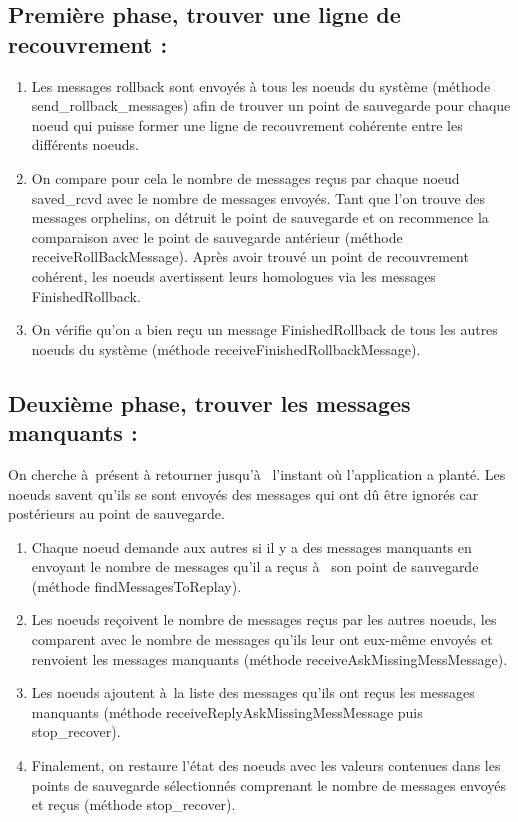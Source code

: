\documentclass[11pt,a4paper]{report}
\begin{document}
\subsection{Première phase, trouver une ligne de recouvrement :}
\begin{enumerate}
\item Les messages rollback sont envoyés à tous les noeuds du système (méthode send\_rollback\_messages) afin de trouver un point de sauvegarde pour chaque noeud qui puisse former une ligne de recouvrement cohérente entre les différents noeuds.
\item On compare pour cela le nombre de messages reçus par chaque noeud saved\_rcvd avec le nombre de messages envoyés. Tant que l'on trouve des messages orphelins, on détruit le point de sauvegarde et on recommence la comparaison avec le point de sauvegarde antérieur (méthode receiveRollBackMessage). Après avoir trouvé un point de recouvrement cohérent, les noeuds avertissent leurs homologues via les messages FinishedRollback.
\item On vérifie qu'on a bien reçu un message FinishedRollback de tous les autres noeuds du système (méthode receiveFinishedRollbackMessage).
\end{enumerate}

\subsection{Deuxième phase, trouver les messages manquants :}

On cherche à présent à retourner jusqu'à  l'instant où l'application a planté. Les noeuds savent qu'ils se sont envoyés des messages qui ont dû être ignorés car postérieurs au point de sauvegarde.
\begin{enumerate}
\item Chaque noeud demande aux autres si il y a des messages manquants en envoyant le nombre de messages qu'il a reçus à  son point de sauvegarde (méthode findMessagesToReplay).
\item Les noeuds reçoivent le nombre de messages reçus par les autres noeuds, les comparent avec le nombre de messages qu'ils leur ont eux-même envoyés et renvoient les messages manquants (méthode receiveAskMissingMessMessage).
\item Les noeuds ajoutent à la liste des messages qu'ils ont reçus les messages manquants (méthode receiveReplyAskMissingMessMessage puis stop\_recover).
\item Finalement, on restaure l'état des noeuds avec les valeurs contenues dans les points de sauvegarde sélectionnés comprenant le nombre de messages envoyés et reçus (méthode stop\_recover).
\end{enumerate}
\end{document}

